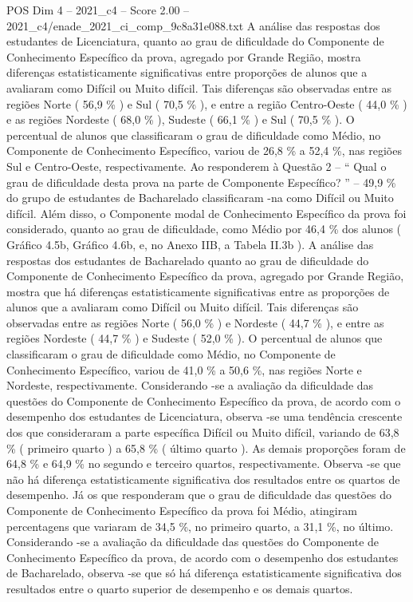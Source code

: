 \begin{textsample}{POS Dim 4 – 2021\_c4 – Score 2.00 – 2021\_c4/enade\_2021\_ci\_comp\_9c8a31e088.txt}
A análise das respostas dos estudantes de Licenciatura, quanto ao grau de dificuldade do Componente de Conhecimento Específico da prova, agregado por Grande Região, mostra diferenças estatisticamente significativas entre proporções de alunos que a avaliaram como Difícil ou Muito difícil.
Tais diferenças são observadas entre as regiões Norte ( 56,9 \% ) e Sul ( 70,5 \% ), e entre a região Centro-Oeste ( 44,0 \% ) e as regiões Nordeste ( 68,0 \% ), Sudeste ( 66,1 \% ) e Sul ( 70,5 \% ).
O percentual de alunos que classificaram o grau de dificuldade como Médio, no Componente de Conhecimento Específico, variou de 26,8 \% a 52,4 \%, nas regiões Sul e Centro-Oeste, respectivamente.
Ao responderem à Questão 2 – “ Qual o grau de dificuldade desta prova na parte de Componente Específico? ” – 49,9 \% do grupo de estudantes de Bacharelado classificaram -na como Difícil ou Muito difícil.
Além disso, o Componente modal de Conhecimento Específico da prova foi considerado, quanto ao grau de dificuldade, como Médio por 46,4 \% dos alunos ( Gráfico 4.5b, Gráfico 4.6b, e, no Anexo IIB, a Tabela II.3b ).
A análise das respostas dos estudantes de Bacharelado quanto ao grau de dificuldade do Componente de Conhecimento Específico da prova, agregado por Grande Região, mostra que há diferenças estatisticamente significativas entre as proporções de alunos que a avaliaram como Difícil ou Muito difícil.
Tais diferenças são observadas entre as regiões Norte ( 56,0 \% ) e Nordeste ( 44,7 \% ), e entre as regiões Nordeste ( 44,7 \% ) e Sudeste ( 52,0 \% ).
O percentual de alunos que classificaram o grau de dificuldade como Médio, no Componente de Conhecimento Específico, variou de 41,0 \% a 50,6 \%, nas regiões Norte e Nordeste, respectivamente.
Considerando -se a avaliação da dificuldade das questões do Componente de Conhecimento Específico da prova, de acordo com o desempenho dos estudantes de Licenciatura, observa -se uma tendência crescente dos que consideraram a parte específica Difícil ou Muito difícil, variando de 63,8 \% ( primeiro quarto ) a 65,8 \% ( último quarto ).
As demais proporções foram de 64,8 \% e 64,9 \% no segundo e terceiro quartos, respectivamente.
Observa -se que não há diferença estatisticamente significativa dos resultados entre os quartos de desempenho.
Já os que responderam que o grau de dificuldade das questões do Componente de Conhecimento Específico da prova foi Médio, atingiram percentagens que variaram de 34,5 \%, no primeiro quarto, a 31,1 \%, no último.
Considerando -se a avaliação da dificuldade das questões do Componente de Conhecimento Específico da prova, de acordo com o desempenho dos estudantes de Bacharelado, observa -se que só há diferença estatisticamente significativa dos resultados entre o quarto superior de desempenho e os demais quartos.

\end{textsample}
